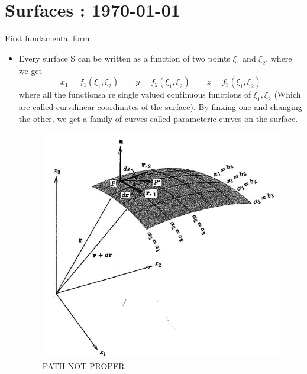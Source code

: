 




\tableofcontents	
	\section{Surfaces : \today}
	\begin{frame}{First fundamental form}
		\begin{itemize}
			\item Every surface S  can be written as a function of two points $\xi_1$ and $\xi_2$, where we get
			\begin{equation}
			x_1 = f_1(\xi_1,\xi_2) \qquad y = f_2(\xi_1,\xi_2)\qquad z = f_3(\xi_1,\xi_2)
			\end{equation}
			where all the functionsa re single valued continuous functions of $\xi_1,\xi_2$ (Which are called curvilinear coordinates of the surface). By finxing one and changing the other, we get a family of curves called parameteric curves on the surface.
			\begin{figure}
				\centering
				\includegraphics[width=0.5\linewidth]{ fig1}
				\caption{PATH NOT PROPER}
				\label{fig:fig1}
			\end{figure}
			
 		\end{itemize}	
 	\end{frame}


